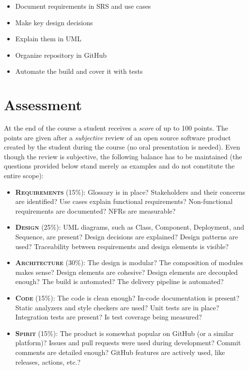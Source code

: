 \documentclass[nobrand,anonymous,nodate,nosecurity]{huawei}
\begin{document}
\begin{itemize}
\item Document requirements in SRS and use cases
\item Make key design decisions
\item Explain them in UML
\item Organize repository in GitHub
\item Automate the build and cover it with tests
\end{itemize}

\newpage
\section*{Assessment}

At the end of the course a student receives a \emph{score} of up
to 100 points. The points are given after a \emph{subjective} review
of an open source software product created by the student during the
course (no oral presentation is needed).
Even though the review is subjective, the following
balance has to be maintained (the questions provided below
stand merely as examples and do not constitute the entire scope):

\begin{itemize}
\item {\bfseries\scshape Requirements} (15\%):
  Glossary is in place?
  Stakeholders and their concerns are identified?
  Use cases explain functional requirements?
  Non-functional requirements are documented?
  NFRs are measurable?
\item {\bfseries\scshape Design} (25\%):
  UML diagrams, such as Class, Component, Deployment, and Sequence, are present?
  Design decisions are explained?
  Design patterns are used?
  Traceability between requirements and design elements is visible?
\item {\bfseries\scshape Architecture} (30\%):
  The design is modular?
  The composition of modules makes sense?
  Design elements are cohesive?
  Design elements are decoupled enough?
  The build is automated?
  The delivery pipeline is automated?
\item {\bfseries\scshape Code} (15\%):
  The code is clean enough?
  In-code documentation is present?
  Static analyzers and style checkers are used?
  Unit tests are in place?
  Integration tests are present?
  Is test coverage being measured?
\item {\bfseries\scshape Spirit} (15\%):
  The product is somewhat popular on GitHub (or a similar platform)?
  Issues and pull requests were used during development?
  Commit comments are detailed enough?
  GitHub features are actively used, like releases, actions, etc.?
\end{itemize}
\end{document}
